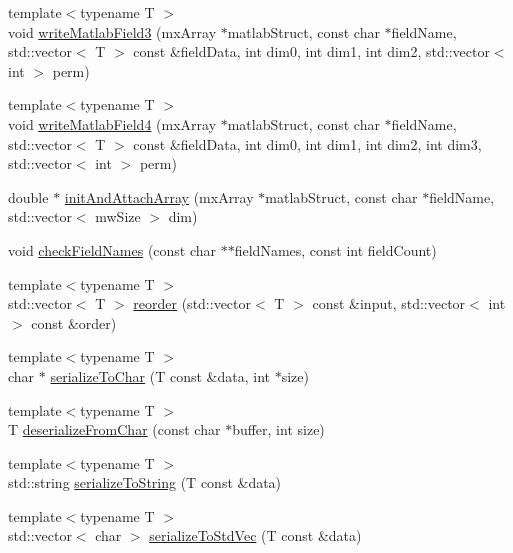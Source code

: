 \begin{DoxyCompactItemize}
{\footnotesize template$<$typename T $>$ }\\void \mbox{\hyperlink{namespaceamici_a1d198c062d2612631b6c2b0fe31e0cd4}{write\+Matlab\+Field3}} (mx\+Array $\ast$matlab\+Struct, const char $\ast$field\+Name, std\+::vector$<$ T $>$ const \&field\+Data, int dim0, int dim1, int dim2, std\+::vector$<$ int $>$ perm)
\item 
{\footnotesize template$<$typename T $>$ }\\void \mbox{\hyperlink{namespaceamici_aee7f18142ce4446132bb2bd5d3b072d8}{write\+Matlab\+Field4}} (mx\+Array $\ast$matlab\+Struct, const char $\ast$field\+Name, std\+::vector$<$ T $>$ const \&field\+Data, int dim0, int dim1, int dim2, int dim3, std\+::vector$<$ int $>$ perm)
\item 
double $\ast$ \mbox{\hyperlink{namespaceamici_a10c4b68cefb537f43f52c1f2f23db5f9}{init\+And\+Attach\+Array}} (mx\+Array $\ast$matlab\+Struct, const char $\ast$field\+Name, std\+::vector$<$ mw\+Size $>$ dim)
\item 
void \mbox{\hyperlink{namespaceamici_ad34a0a8f0a3d44e86371a2ecb5841c09}{check\+Field\+Names}} (const char $\ast$$\ast$field\+Names, const int field\+Count)
\item 
{\footnotesize template$<$typename T $>$ }\\std\+::vector$<$ T $>$ \mbox{\hyperlink{namespaceamici_a34977c9aa241ea37421d94946baa77d2}{reorder}} (std\+::vector$<$ T $>$ const \&input, std\+::vector$<$ int $>$ const \&order)
\item 
{\footnotesize template$<$typename T $>$ }\\char $\ast$ \mbox{\hyperlink{namespaceamici_a042a9a4166aeef6cd263d9975a4192ed}{serialize\+To\+Char}} (T const \&data, int $\ast$size)
\item 
{\footnotesize template$<$typename T $>$ }\\T \mbox{\hyperlink{namespaceamici_ad633859edca1bf95ecdbdb5500d3c28c}{deserialize\+From\+Char}} (const char $\ast$buffer, int size)
\item 
{\footnotesize template$<$typename T $>$ }\\std\+::string \mbox{\hyperlink{namespaceamici_aed4ae7f193798ade342a0f70491e849e}{serialize\+To\+String}} (T const \&data)
\item 
{\footnotesize template$<$typename T $>$ }\\std\+::vector$<$ char $>$ \mbox{\hyperlink{namespaceamici_ad5b38b6ae6007acbaf43521f2a616937}{serialize\+To\+Std\+Vec}} (T const \&data)
\item 
$$
\end{DoxyCompactItemize}
